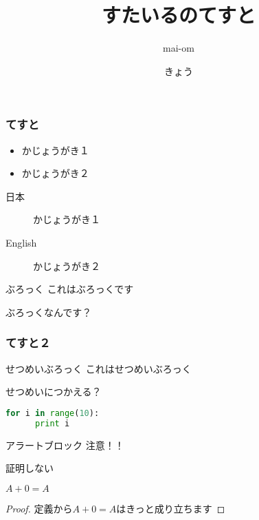 \documentclass[17pt,aspectratio=1610,cjk,dvipdfmx]{beamer}
\title{すたいるのてすと}
\author{mai-om}
\date{きょう}
\begin{document}
\maketitle{}

\begin{frame}
  \frametitle{てすと}
  
  \begin{itemize}
      \item かじょうがき１
      \item かじょうがき２
  \end{itemize}

  \begin{description}
      \item[日本] かじょうがき１
      \item[English] かじょうがき２
  \end{description}
  
  \begin{block}{ぶろっく}
    これはぶろっくです

    ぶろっくなんです？
  \end{block}
\end{frame}

\begin{frame}[fragile]
  \frametitle{てすと２}

  \begin{exampleblock}{せつめいぶろっく}
    これはせつめいぶろっく

    せつめいにつかえる？

\begin{lstlisting}[language=Python, basicstyle=\small\ttfamily]
  for i in range(10):
      print i
\end{lstlisting}
  \end{exampleblock}

  \begin{alertblock}{アラートブロック}
    注意！！
  \end{alertblock}

\end{frame}


\begin{frame}{証明しない}
\begin{theorem}
  $A + 0 = A$
\end{theorem}
\begin{proof}
  定義から$A + 0 = A$はきっと成り立ちます
\end{proof}
\end{frame}
\end{document}
